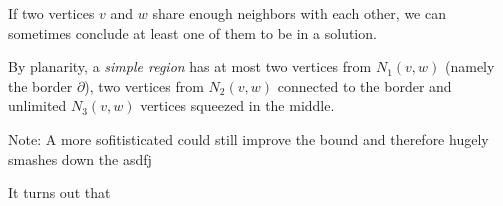 If two vertices $v$ and $w$ share enough neighbors with each other, we can sometimes conclude at least one of them to be in a solution. 

By planarity, a \textit{simple region} has at most two vertices from $N_1(v,w)$ (namely the border $\partial$), two vertices from $N_2(v,w)$ connected to the border and unlimited $N_3(v,w)$ vertices squeezed in the middle.


Note: A more sofitisticated could still improve the bound and therefore hugely smashes down the asdfj

It turns out that 

%
%
%
%
%
%
%
%
%
%
%
%


